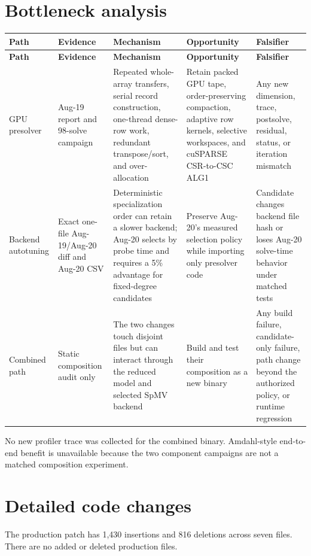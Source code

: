 \documentclass[10pt,a4paper]{article}
\begin{document}
\section{Bottleneck analysis}

\begin{longtable}{@{}P{0.16\textwidth}P{0.18\textwidth}P{0.18\textwidth}P{0.19\textwidth}P{0.13\textwidth}@{}}
\toprule
\textbf{Path} & \textbf{Evidence} & \textbf{Mechanism} & \textbf{Opportunity} & \textbf{Falsifier}\\
\midrule
\endfirsthead
\toprule
\textbf{Path} & \textbf{Evidence} & \textbf{Mechanism} & \textbf{Opportunity} & \textbf{Falsifier}\\
\midrule
\endhead
GPU presolver & Aug-19 report and 98-solve campaign & Repeated whole-array transfers, serial record construction, one-thread dense-row work, redundant transpose/sort, and over-allocation & Retain packed GPU tape, order-preserving compaction, adaptive row kernels, selective workspaces, and cuSPARSE CSR-to-CSC ALG1 & Any new dimension, trace, postsolve, residual, status, or iteration mismatch\\
Backend autotuning & Exact one-file Aug-19/Aug-20 diff and Aug-20 CSV & Deterministic specialization order can retain a slower backend; Aug-20 selects by probe time and requires a 5\% advantage for fixed-degree candidates & Preserve Aug-20's measured selection policy while importing only presolver code & Candidate changes backend file hash or loses Aug-20 solve-time behavior under matched tests\\
Combined path & Static composition audit only & The two changes touch disjoint files but can interact through the reduced model and selected SpMV backend & Build and test their composition as a new binary & Any build failure, candidate-only failure, path change beyond the authorized policy, or runtime regression\\
\bottomrule
\end{longtable}

No new profiler trace was collected for the combined binary.  Amdahl-style
end-to-end benefit is unavailable because the two component campaigns are not
a matched composition experiment.

\section{Detailed code changes}

The production patch has 1,430 insertions and 816 deletions across seven
files.  There are no added or deleted production files.
\end{document}
